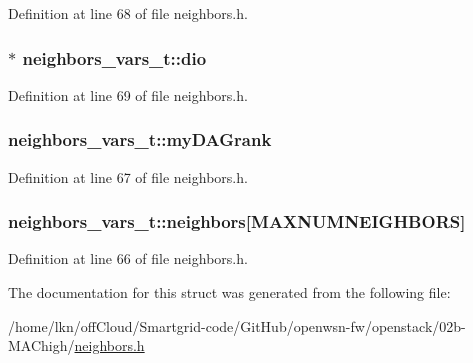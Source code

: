 Definition at line 68 of file neighbors.\+h.

\subsubsection[{\texorpdfstring{dio}{dio}}]{$\ast$ neighbors\+\_\+vars\+\_\+t\+::dio}\hypertarget{structneighbors__vars__t_a09c8cef2e547e5772a515f1eabcf6a50}{}\label{structneighbors__vars__t_a09c8cef2e547e5772a515f1eabcf6a50}


Definition at line 69 of file neighbors.\+h.

\subsubsection[{\texorpdfstring{my\+D\+A\+Grank}{myDAGrank}}]{ neighbors\+\_\+vars\+\_\+t\+::my\+D\+A\+Grank}\hypertarget{structneighbors__vars__t_ad1da31e11ab0382ffbf1189e7803abcb}{}\label{structneighbors__vars__t_ad1da31e11ab0382ffbf1189e7803abcb}


Definition at line 67 of file neighbors.\+h.

\subsubsection[{\texorpdfstring{neighbors}{neighbors}}]{ neighbors\+\_\+vars\+\_\+t\+::neighbors\mbox{[}{\bf M\+A\+X\+N\+U\+M\+N\+E\+I\+G\+H\+B\+O\+RS}\mbox{]}}\hypertarget{structneighbors__vars__t_a0c28f8211f44d7a1ac87fb0f20832830}{}\label{structneighbors__vars__t_a0c28f8211f44d7a1ac87fb0f20832830}


Definition at line 66 of file neighbors.\+h.



The documentation for this struct was generated from the following file\+:\begin{DoxyCompactItemize}
\item 
/home/lkn/off\+Cloud/\+Smartgrid-\/code/\+Git\+Hub/openwsn-\/fw/openstack/02b-\/\+M\+A\+Chigh/\hyperlink{neighbors_8h}{neighbors.\+h}\end{DoxyCompactItemize}
